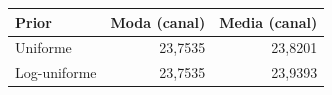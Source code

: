 \begin{tabular}{lrr}
\toprule
Prior & Moda (canal) & Media (canal) \\
\midrule
Uniforme & 23,7535 & 23,8201 \\
Log-uniforme & 23,7535 & 23,9393 \\
\bottomrule
\end{tabular}
